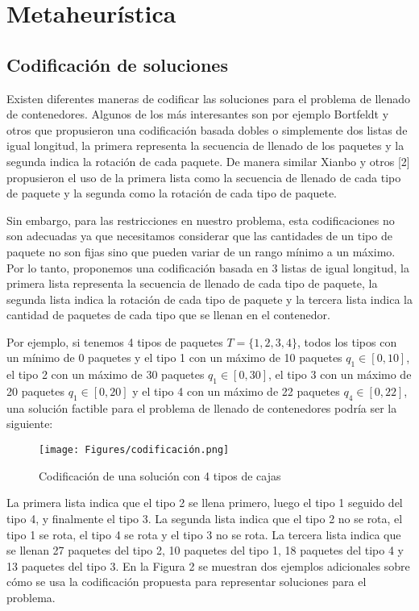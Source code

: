 \section{Metaheurística}

\subsection{Codificación de soluciones}
    
Existen diferentes maneras de codificar las soluciones para el problema de llenado de contenedores. Algunos de los más interesantes son por ejemplo Bortfeldt y otros \cite{GEHRING1997401} que propusieron una codificación basada dobles o simplemente dos listas de igual longitud, la primera representa la secuencia de llenado de los paquetes y la segunda indica la rotación de cada paquete. De manera similar Xianbo y otros [2] propusieron el uso de la primera lista como la secuencia de llenado de cada tipo de paquete y la segunda como la rotación de cada tipo de paquete.

Sin embargo, para las restricciones en nuestro problema, esta codificaciones no son adecuadas ya que necesitamos considerar que las cantidades de un tipo de paquete no son fijas sino que pueden variar de un rango mínimo a un máximo. Por lo tanto, proponemos una codificación basada en 3 listas de igual longitud, la primera lista representa la secuencia de llenado de cada tipo de paquete, la segunda lista indica la rotación de cada tipo de paquete y la tercera lista indica la cantidad de paquetes de cada tipo que se llenan en el contenedor.


Por ejemplo, si tenemos 4 tipos de paquetes $T=\{1,2,3,4\}$, todos los tipos con un mínimo de 0 paquetes y el tipo 1 con un máximo de 10 paquetes $q_1 \in [0,10]$, el tipo 2 con un máximo de 30 paquetes $q_1 \in [0,30]$, el tipo 3 con un máximo de 20 paquetes $q_1 \in [0,20]$ y el tipo 4 con un máximo de 22 paquetes $q_4 \in [0,22]$, una solución factible para el problema de llenado de contenedores podría ser la siguiente:

\begin{figure}[H]
    \centering
    \texttt{[image: Figures/codificación.png]}
    \caption{Codificación de una solución con 4 tipos de cajas}
    \label{fig:codificación}
\end{figure}

La primera lista indica que el tipo 2 se llena primero, luego el tipo 1 seguido del tipo 4, y finalmente el tipo 3. La segunda lista indica que el tipo 2 no se rota, el tipo 1 se rota, el tipo 4 se rota y el tipo 3 no se rota. La tercera lista indica que se llenan 27 paquetes del tipo 2, 10 paquetes del tipo 1, 18 paquetes del tipo 4 y 13 paquetes del tipo 3. En la Figura 2 se muestran dos ejemplos adicionales sobre cómo se usa la codificación propuesta para representar soluciones para el problema.

